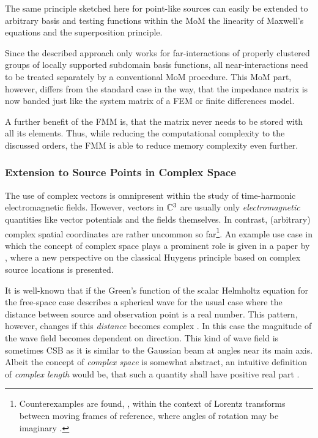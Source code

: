 The same principle sketched here for point-like sources can easily be extended
to arbitrary basis and testing functions within the \ac{MoM} the linearity of
Maxwell's equations and the superposition principle.

Since the described approach only works for far-interactions of properly
clustered groups of locally supported subdomain basis functions, all 
near-interactions need to be treated separately by a conventional
\ac{MoM} procedure.
This \ac{MoM} part, however, differs from the standard case in the way, that
the impedance matrix is now banded just like the system matrix of a \ac{FEM}
or finite differences model.

A further benefit of the \ac{FMM} is, that the matrix never needs to be stored
with all its elements.
Thus, while reducing the computational complexity to the discussed orders,
the \ac{FMM} is able to reduce memory complexity even further.







\subsubsection{Extension to Source Points in Complex Space}

The use of complex vectors \cite[Chapter~1]{Lindell2000} is omnipresent within
the study of time-harmonic electromagnetic fields.
However, vectors in $\mathbb{C}^3$ are usually only \emph{electromagnetic} quantities
like vector potentials and the fields themselves.
In contrast, (arbitrary) complex spatial coordinates are rather uncommon so
far\footnote{
	Counterexamples are found, \eg, within the context of Lorentz
	transforms between moving frames of reference, where angles of rotation may
	be imaginary \cite[Chapter~11]{Jackson2013}.
	}.
An example use case in which the concept of complex space plays a prominent role
is given in a paper by \textcite{Hansen2009}, where a new perspective on the
classical Huygens principle based on complex source locations is presented. 

It is well-known that if the Green's function of the scalar Helmholtz equation
for the free-space case describes a spherical wave for the usual case where
the distance between source and observation point is a real number.
This pattern, however, changes if this \emph{distance} becomes complex
\cite{Deschamps1971,Keller1971,Couture1981}.
In this case the magnitude of the wave field becomes dependent on direction.
This kind of wave field is sometimes \ac{CSB} as it is similar to the
Gaussian beam \cite[pp.~626]{hecht2017} at angles near its main axis.
Albeit the concept of \emph{complex space} is somewhat abstract, an intuitive
definition of \emph{complex length} would be, that such a quantity shall have
positive real part \cite{Hansen2009, Hansen2013}.


